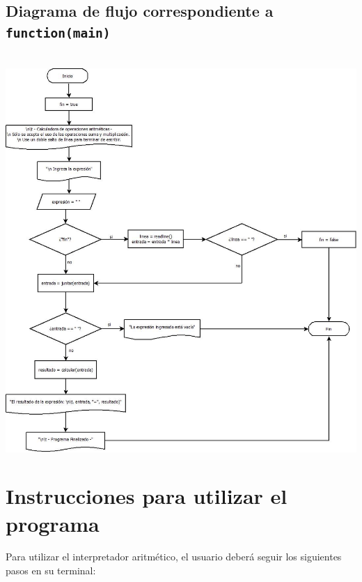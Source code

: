 \documentclass{article}
\begin{document}
\subsection{Diagrama de flujo correspondiente a \texttt{function(main)}}\\
\includegraphics[scale=0.65]{Diagrama7.jpeg}

\newpage
\section{Instrucciones para utilizar el programa}
Para utilizar el interpretador aritmético, el usuario deberá seguir los siguientes pasos en su terminal:
\end{document}
